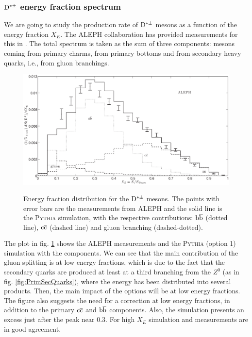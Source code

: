 \documentclass[a4paper,12pt]{article}
\begin{document}
\subsubsection{$\D^{*\pm}$ energy fraction spectrum}

We are going to study the production rate of $\D^{*\pm}$ mesons as a function of the energy fraction $X_E$. The ALEPH collaboration has provided measurements for this in \cite{Barate:1999bg}. The total spectrum is taken as the sum of three components: mesons coming from primary charms, from primary bottoms and from secondary heavy quarks, i.e., from gluon branchings.

\begin{figure}[h]
\centering
\caption[Energy fraction spectrum of the $\D^{*\pm}$ mesons.]{Energy fraction distribution for the $\D^{*\pm}$ mesons. The points with error bars are the measurements from ALEPH and the solid line is the \textsc{Pythia} simulation, with the respective contributions: ${\mathrm b}\overline{\mathrm b}$ (dotted line), ${\mathrm c}\overline{\mathrm c}$ (dashed line) and gluon branching (dashed-dotted).}
\includegraphics[width=15cm]{DStarOp1Thesis.eps}
\label{fig:ALEPHPythia1}
\end{figure}

The plot in fig. \ref{fig:ALEPHPythia1} shows the ALEPH measurements and the \textsc{Pythia} (option 1) simulation with the components. We can see that the main contribution of the gluon splitting is at low energy fractions, which is due to the fact that the secondary quarks are produced at least at a third branching from the $Z^0$ (as in fig. \ref{fig:PrimSecQuarks}), where the energy has been distributed into several products. Then, the main impact of the options will be at low energy fractions. The figure also suggests the need for a correction at low energy fractions, in addition to the primary ${\mathrm c}\overline{\mathrm c}$ and ${\mathrm b}\overline{\mathrm b}$ components. Also, the simulation presents an excess just after the peak near 0.3. For high $X_E$ simulation and measurements are in good agreement.
\end{document}

